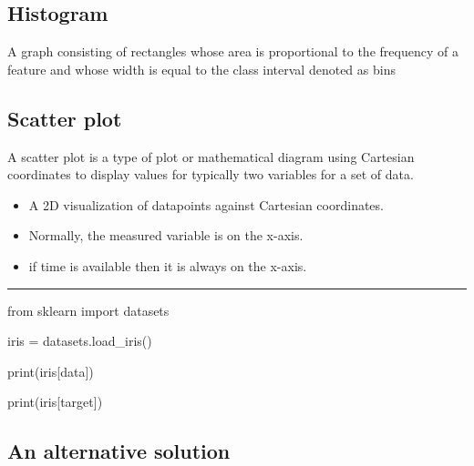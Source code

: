 \documentclass[
  letterpaper,
  DIV=11,
  numbers=noendperiod]{scrartcl}
\newenvironment{Shaded}{\begin{snugshade}}{\end{snugshade}}
\newcommand{\BuiltInTok}[1]{\textcolor[rgb]{0.00,0.23,0.31}{#1}}
\newcommand{\ImportTok}[1]{\textcolor[rgb]{0.00,0.46,0.62}{#1}}
\newcommand{\NormalTok}[1]{\textcolor[rgb]{0.00,0.23,0.31}{#1}}
\newcommand{\OperatorTok}[1]{\textcolor[rgb]{0.37,0.37,0.37}{#1}}
\newcommand{\StringTok}[1]{\textcolor[rgb]{0.13,0.47,0.30}{#1}}
\begin{document}
\subsection{Histogram}\label{histogram}

A graph consisting of rectangles whose area is proportional to the
frequency of a feature and whose width is equal to the class interval
denoted as bins

\subsection{Scatter plot}\label{scatter-plot}

A scatter plot is a type of plot or mathematical diagram using Cartesian
coordinates to display values for typically two variables for a set of
data.

\begin{itemize}
\item
  A 2D visualization of datapoints against Cartesian coordinates.
\item
  Normally, the measured variable is on the x-axis.
\item
  if time is available then it is always on the x-axis.
\end{itemize}

\begin{center}\rule{0.5\linewidth}{0.5pt}\end{center}

\begin{Shaded}
\begin{Highlighting}[]
\ImportTok{from}\NormalTok{ sklearn }\ImportTok{import}\NormalTok{ datasets}
\end{Highlighting}
\end{Shaded}

\begin{Shaded}
\begin{Highlighting}[]
\NormalTok{iris }\OperatorTok{=}\NormalTok{ datasets.load\_iris()}

\BuiltInTok{print}\NormalTok{(iris[}\StringTok{\textquotesingle{}data\textquotesingle{}}\NormalTok{])}

\BuiltInTok{print}\NormalTok{(iris[}\StringTok{\textquotesingle{}target\textquotesingle{}}\NormalTok{])}
\end{Highlighting}
\end{Shaded}

\subsection{An alternative solution}\label{an-alternative-solution}
\end{document}
